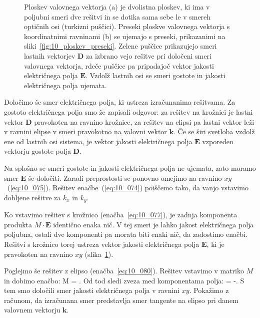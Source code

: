 \begin{figure}[h]
\centering
\def\svgwidth{140truemm} 

\caption{Ploskev valovnega vektorja (a) je dvolistna ploskev, ki ima v poljubni smeri dve rešitvi in 
se dotika sama sebe le v smereh optičnih osi (turkizni puščici). Preseki ploskve valovnega vektorja
s koordinatnimi ravninami (b) se ujemajo s preseki, prikazanimi na sliki~\ref{fig:10_ploskev_preseki}.
Zelene puščice prikazujejo smeri lastnih vektorjev $\mathbf{D}$ za izbrano vejo rešitve pri 
določeni smeri valovnega vektorja, rdeče puščice pa pripadajoč vektor jakosti električnega polja 
$\mathbf{E}$. Vzdolž lastnih osi se smeri gostote in jakosti električnega polja ujemata.}
\label{fig:10_ploskev_3D}
\end{figure}
 
Določimo še smer električnega polja, ki ustreza izračunanima rešitvama. Za gostoto električnega polja
smo že zapisali odgovor: za rešitev na krožnici je lastni vektor $\mathbf{D}$ pravokoten
na ravnino krožnice, za rešitev na elipsi pa lastni vektor leži v ravnini elipse v smeri pravokotno 
na valovni vektor $\mathbf{k}$. Če se širi svetloba vzdolž ene od lastnih osi
sistema, je vektor jakosti električnega polja $\mathbf{E}$ vzporeden vektorju gostote polja $\mathbf{D}$.

Na splošno se smeri gostote in jakosti električnega polja ne ujemata, zato moramo smer $\mathbf{E}$
še določiti. Zaradi preprostosti se ponovno omejimo na ravnino $xy$~(\ref{eq:10_075}). Rešitev 
enačbe~(\ref{eq:10_074}) poiščemo tako, da vanjo vstavimo dobljene rešitve za $k_x$ in $k_y$.

Ko vstavimo rešitev s krožnico (enačba~\ref{eq:10_077}), je zadnja komponenta
produkta $M\cdot \mathbf{E}$ identično 
enaka nič. V tej smeri je lahko jakost električnega polja poljubna, ostali dve komponenti pa morata
biti enaki nič, da zadostimo enačbi.
Rešitvi s krožnico torej ustreza vektor jakosti električnega polja $\mathbf{E}$, ki
je pravokoten na ravnino $xy$ (slika~\ref{fig:10_ploskev_3D}).

Poglejmo še rešitev z elipso (enačba~\ref{eq:10_080}). Rešitev vstavimo v matriko $M$ in dobimo
enačbo:
\beq
M \cdot {}=  \cdot
{}.
\label{eq:10_087}
\eeq
Od tod sledi zveza med komponentama polja:
\beq
{} = -.
\label{eq:10_088}
\eeq
S tem smo določili smer jakosti električnega polja v ravnini $xy$. Pokažimo z računom,
da izračunana smer predstavlja smer tangente na elipso pri danem valovnem vektorju $\mathbf{k}$. 

